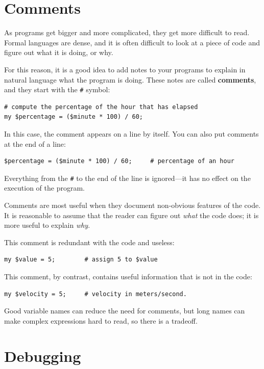\section{Comments}

As programs get bigger and more complicated, they get more difficult
to read.  Formal languages are dense, and it is often difficult to
look at a piece of code and figure out what it is doing, or why.

For this reason, it is a good idea to add notes to your programs to explain
in natural language what the program is doing.  These notes are called
{\bf comments}, and they start with the \verb"#" symbol:

\begin{verbatim}
# compute the percentage of the hour that has elapsed
my $percentage = ($minute * 100) / 60;
\end{verbatim}
%
In this case, the comment appears on a line by itself.  You can also put
comments at the end of a line:

\begin{verbatim}
$percentage = ($minute * 100) / 60;     # percentage of an hour
\end{verbatim}
%
Everything from the {\tt \#} to the end of the line is ignored---it
has no effect on the execution of the program.

Comments are most useful when they document non-obvious features of
the code.  It is reasonable to assume that the reader can figure out
{\em what} the code does; it is more useful to explain {\em why}.

This comment is redundant with the code and useless:

\begin{verbatim}
my $value = 5;        # assign 5 to $value
\end{verbatim}
%
This comment, by contrast, contains useful information that 
is not in the code:

\begin{verbatim}
my $velocity = 5;     # velocity in meters/second. 
\end{verbatim}
%
Good variable names can reduce the need for comments, but
long names can make complex expressions hard to read, so there is
a tradeoff.


\section{Debugging}

